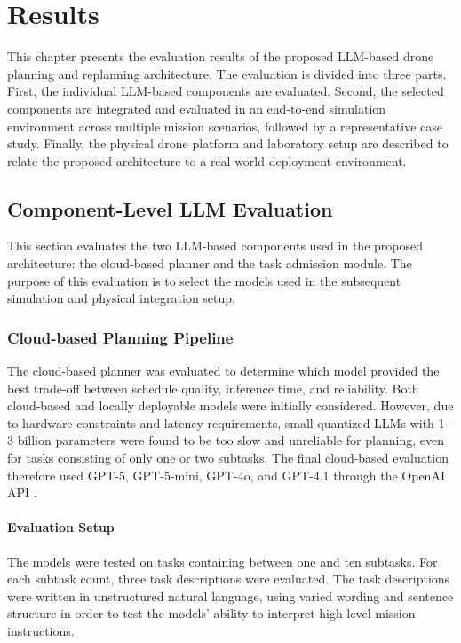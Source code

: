 \chapter{Results}

This chapter presents the evaluation results of the proposed LLM-based drone planning and replanning
architecture. The evaluation is divided into three parts. First, the individual LLM-based components are
evaluated. 
Second, the selected components are integrated and evaluated in an end-to-end simulation
environment across multiple mission scenarios, followed by a representative case study.
Finally, the physical drone platform and laboratory setup are described to relate the proposed architecture
to a real-world deployment environment.

\section{Component-Level LLM Evaluation}

This section evaluates the two LLM-based components used in the proposed architecture:
the cloud-based planner and the task admission module. The purpose of this
evaluation is to select the models used in the subsequent simulation and physical integration setup.

\subsection{Cloud-based Planning Pipeline}
\label{sec:cloud_planning_evaluation}
The cloud-based planner was evaluated to determine which model provided the best trade-off between
schedule quality, inference time, and reliability. Both cloud-based and locally deployable models were
initially considered. However, due to hardware constraints and latency requirements, small
quantized LLMs with 1--3 billion parameters were found to be too slow and unreliable for planning,
even for tasks consisting of only one or two subtasks. The final cloud-based evaluation therefore used
GPT-5, GPT-5-mini, GPT-4o, and GPT-4.1 through the OpenAI API \cite{openai_models}.

\subsubsection{Evaluation Setup}
The models were tested on tasks containing between one and ten subtasks. For each subtask count,
three task descriptions were evaluated. The task descriptions were written in unstructured natural
language, using varied wording and sentence structure in order to test the models' ability to interpret
high-level mission instructions.

